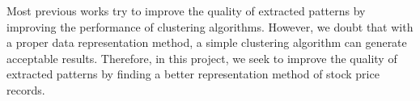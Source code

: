 Most previous works try to improve the quality of extracted patterns by improving the performance of clustering algorithms. However, we doubt that with a proper data representation method, a simple clustering algorithm can generate acceptable results. Therefore, in this project, we seek to improve the quality of extracted patterns by finding a better representation method of stock price records.